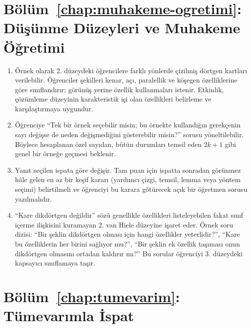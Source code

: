 \section{Bölüm~\ref{chap:muhakeme-ogretimi}: Düşünme Düzeyleri ve Muhakeme Öğretimi}

\begin{enumerate}
\item Örnek olarak 2. düzeydeki öğrencilere farklı yönlerde çizilmiş dörtgen kartları verilebilir. Öğrenciler şekilleri kenar, açı, paralellik ve köşegen özelliklerine göre sınıflandırır; görünüş yerine özellik kullanmaları istenir. Etkinlik, çözümleme düzeyinin karakteristik işi olan özellikleri belirleme ve karşılaştırmaya uygundur.

\item Öğrenciye ``Tek bir örnek seçebilir misin; bu örnekte kullandığın gerekçenin sayı değişse de neden değişmediğini gösterebilir misin?'' sorusu yöneltilebilir. Böylece hesaplanan özel sayıdan, bütün durumları temsil eden $2k+1$ gibi genel bir örneğe geçmesi beklenir.

\item Yanıt seçilen ispata göre değişir. Tam puan için ispatta sonradan görünmez hâle gelen en az bir keşif kararı (yardımcı çizgi, temsil, lemma veya yöntem seçimi) belirtilmeli ve öğrenciyi bu karara götürecek açık bir öğretmen sorusu yazılmalıdır.

\item ``Kare dikdörtgen değildir'' sözü genellikle özellikleri listeleyebilen fakat sınıf içerme ilişkisini kuramayan 2. van Hiele düzeyine işaret eder. Örnek soru dizisi: ``Bir şeklin dikdörtgen olması için hangi özellikler yeterlidir?'', ``Kare bu özelliklerin her birini sağlıyor mu?'', ``Bir şeklin ek özellik taşıması onun dikdörtgen olmasını ortadan kaldırır mı?'' Bu sorular öğrenciyi 3. düzeydeki kapsayıcı sınıflamaya taşır.
\end{enumerate}

\section{Bölüm~\ref{chap:tumevarim}: Tümevarımla İspat}

